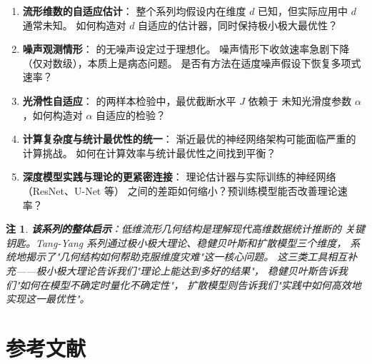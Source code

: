 \documentclass[12pt]{amsbook}
\theoremstyle{plain}
\newtheorem*{Remark}{注}
\newcommand{\noteinfo}[1]{%
  \begin{Remark}
    \textit{#1}
  \end{Remark}
}
\begin{document}
\begin{enumerate}
    \item \textbf{流形维数的自适应估计}：
          整个系列均假设内在维度 $d$ 已知，但实际应用中 $d$ 通常未知。
          如何构造对 $d$ 自适应的估计器，同时保持极小极大最优性？

    \item \textbf{噪声观测情形}：
          \citep{tang2022minimax} 的无噪声设定过于理想化。
          噪声情形下收敛速率急剧下降（仅对数级），本质上是病态问题。
          是否有方法在适度噪声假设下恢复多项式速率？

    \item \textbf{光滑性自适应}：
          \citep{tang2023twosample} 的两样本检验中，最优截断水平 $J$ 依赖于
          未知光滑度参数 $\alpha$，如何构造对 $\alpha$ 自适应的检验？

    \item \textbf{计算复杂度与统计最优性的统一}：
          渐近最优的神经网络架构可能面临严重的计算挑战。
          如何在计算效率与统计最优性之间找到平衡？

    \item \textbf{深度模型实践与理论的更紧密连接}：
          理论估计器与实际训练的神经网络（ResNet、U-Net 等）
          之间的差距如何缩小？预训练模型能否改善理论速率？
\end{enumerate}

\noteinfo{
\textbf{该系列的整体启示}：低维流形几何结构是理解现代高维数据统计推断的
关键钥匙。Tang-Yang 系列通过极小极大理论、稳健贝叶斯和扩散模型三个维度，
系统地揭示了"几何结构如何帮助克服维度灾难"这一核心问题。
这三类工具相互补充——极小极大理论告诉我们"理论上能达到多好的结果"，
稳健贝叶斯告诉我们"如何在模型不确定时量化不确定性"，
扩散模型则告诉我们"实践中如何高效地实现这一最优性"。}

\section{参考文献}\label{sec:tang-refs}

\end{document}
